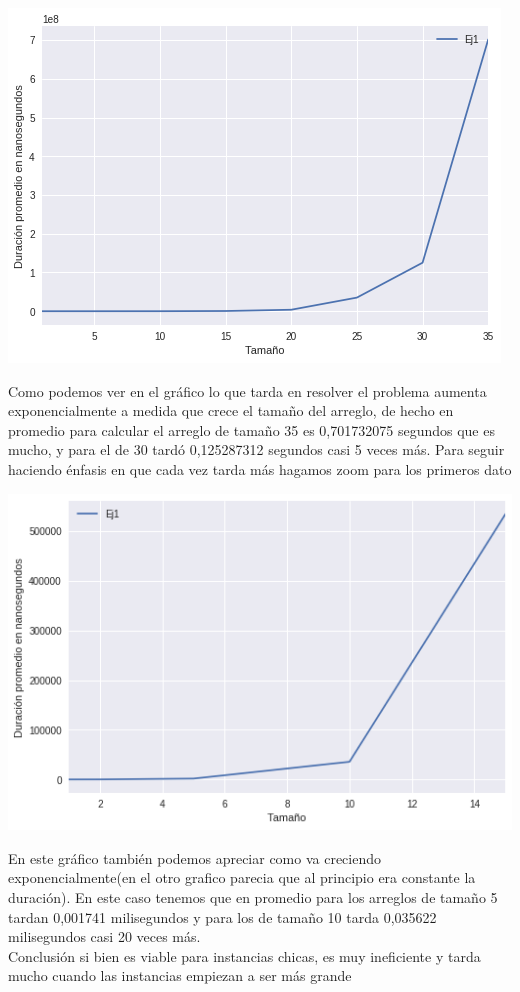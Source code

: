 \begin{center}
\includegraphics[scale=0.5]{ej1Random1-40.png}\\
\end{center}
Como podemos ver en el gráfico lo que tarda en resolver el problema aumenta exponencialmente a medida que crece el tamaño del arreglo, de hecho en promedio para calcular el arreglo de tamaño 35 es  0,701732075 segundos que es mucho, y para el de 30 tardó 0,125287312 segundos casi 5 veces más. Para seguir haciendo énfasis en que cada vez tarda más hagamos zoom para los primeros dato\\
\begin{center} 
\includegraphics[scale=0.5]{ej1Random1-5.png}\\
\end{center}
En este gráfico también podemos apreciar como va creciendo exponencialmente(en el otro grafico parecia que al principio era constante la duración). En este caso tenemos que en promedio para los arreglos de tamaño 5 tardan 0,001741 milisegundos y para los de tamaño 10 tarda 0,035622 milisegundos casi 20 veces más.\\
Conclusión si bien es viable para instancias chicas, es muy ineficiente y tarda mucho cuando las instancias empiezan a ser más grande\\




